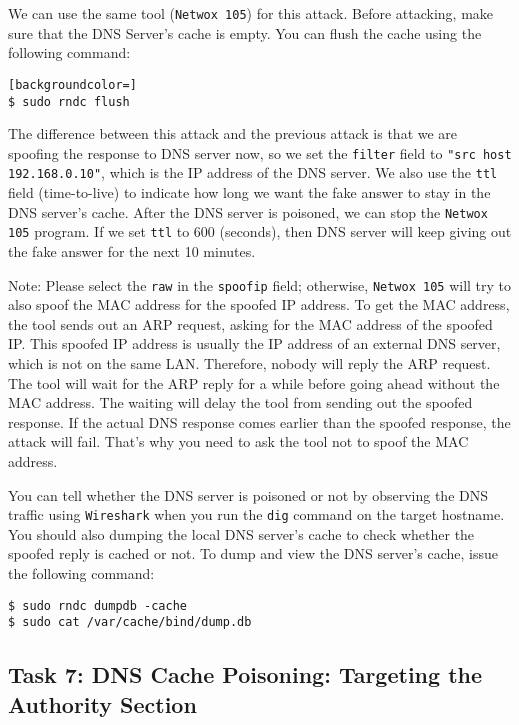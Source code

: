 We can use the same tool (\texttt{Netwox 105}) for this attack. Before attacking, 
make sure that the DNS Server's cache is empty. 
You can flush the cache using the following command:

\begin{lstlisting}[backgroundcolor=]
$ sudo rndc flush
\end{lstlisting}

The difference between this attack and the previous attack is that 
we are spoofing the response to
DNS server now, so we set the {\tt filter} field to 
\texttt{"src host 192.168.0.10"}, 
which is the IP address of the DNS server.
We also use the {\tt ttl} field (time-to-live) 
to indicate how long we want the fake answer to 
stay in the DNS server's cache.  After the DNS server is poisoned, we can stop 
the {\tt Netwox 105} program. If we set {\tt ttl} to 600 (seconds), then DNS server will keep 
giving out the fake answer for the next 10 minutes.

Note: Please select the {\tt raw} in the {\tt spoofip} field; 
otherwise, {\tt Netwox 105} will
try to also spoof the MAC address for the spoofed IP address. To get
the MAC address, the tool sends out an ARP request, asking for the MAC
address of the spoofed IP.
This spoofed IP address is usually the IP address of an external
DNS server, which is not on the same LAN. Therefore,
nobody will reply the ARP request. The tool will wait for the ARP reply
for a while before going ahead without the MAC address.
The waiting will delay the tool from sending out the spoofed 
response. If the actual DNS response comes earlier than the spoofed response,
the attack will fail. That's why you need to ask the tool not to spoof the 
MAC address.


You can tell whether the DNS server is poisoned or not by observing the DNS
traffic using {\tt Wireshark} when you run the \texttt{dig} command 
on the target hostname. You should also dumping the local DNS server's cache 
to check whether the spoofed reply is cached or not. 
To dump and view the DNS server's cache, issue the following command:


\begin{lstlisting}
$ sudo rndc dumpdb -cache
$ sudo cat /var/cache/bind/dump.db
\end{lstlisting}



\subsection{Task 7: DNS Cache Poisoning: Targeting the Authority Section}

